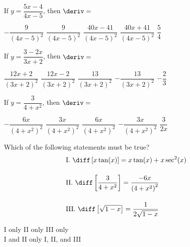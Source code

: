 \begin{questions}
    \question If $y = \dfrac{5x - 4}{4x - 5}$, then $\deriv = $ \\

    \begin{oneparchoices}
        \choice $-\dfrac{9}{(4x - 5)^2}$
        \choice $\dfrac{9}{(4x - 5)^2}$ 
        \choice $\dfrac{40x - 41}{(4x - 5)^2}$
        \choice $\dfrac{40x + 41}{(4x - 5)^2}$
        \choice $\dfrac{5}{4}$
    \end{oneparchoices} \par \horizontalline

    \question If $y = \dfrac{3 - 2x}{3x + 2}$, then $\deriv = $ \\

    \begin{oneparchoices}
        \choice $\dfrac{12x + 2}{(3x + 2)^2}$
        \choice $\dfrac{12x - 2}{(3x + 2)^2}$
        \choice $\dfrac{13}{(3x + 2)^2}$
        \choice $-\dfrac{13}{(3x + 2)^2}$
        \choice $-\dfrac{2}{3}$
    \end{oneparchoices} \par \horizontalline

    \question If $y = \dfrac{3}{4 + x^2}$, then $\deriv = $ \\

    \begin{oneparchoices}
        \choice $-\dfrac{6x}{\left(4 + x^2\right)^2}$
        \choice $\dfrac{3x}{\left(4 + x^2\right)^2}$
        \choice $\dfrac{6x}{\left(4 + x^2\right)^2}$
        \choice $-\dfrac{3x}{\left(4 + x^2\right)^2}$
        \choice $\dfrac{3}{2x}$
    \end{oneparchoices} \par \horizontalline

    \question Which of the following statements must be true? \begin{align*}
        & \text{I. } \diff \left[x\tan (x)\right] = x\tan (x) + x\sec^2 (x) \\[11pt]
        & \text{II. } \diff \left[\dfrac{3}{4 + x^2}\right] = \dfrac{-6x}{\left(4 + x^2\right)^2} \\[11pt]
        & \text{III. } \diff \left[\sqrt{1 - x}\right] = \dfrac{1}{2\sqrt{1 - x}}
    \end{align*}

    \begin{oneparchoices}
        \choice I only 
        \choice II only 
        \choice III only \\[11pt]
        \makebox[0.2 \textwidth] \choice I and II only 
        \makebox[0.25 \textwidth] \choice I, II, and III
    \end{oneparchoices} \par \horizontalline
\end{questions}